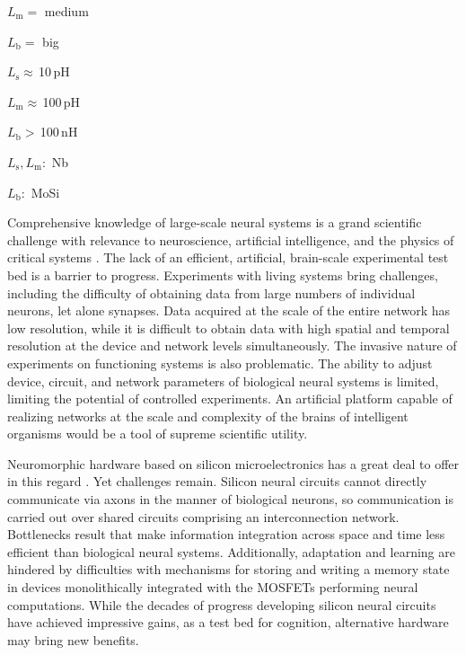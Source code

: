 \documentclass[twocolumn]{article}
\begin{document}
\noindent $L_{\mathrm{m}} =$ medium

\noindent $L_{\mathrm{b}} =$ big

\noindent $L_{\mathrm{s}} \approx$\,10\,pH

\noindent $L_{\mathrm{m}} \approx$\,100\,pH

\noindent $L_{\mathrm{b}} >$\,100\,nH

\noindent $L_{\mathrm{s}}, L_{\mathrm{m}}\!\!:$ Nb

\noindent $L_{\mathrm{b}}\!\!:$ MoSi

Comprehensive knowledge of large-scale neural systems is a grand scientific challenge with relevance to neuroscience, artificial intelligence, and the physics of critical systems \cite{elst2012,ized2008,br2017,fama2019,eide2019}. The lack of an efficient, artificial, brain-scale experimental test bed is a barrier to progress. Experiments with living systems bring challenges, including the difficulty of obtaining data from large numbers of individual neurons, let alone synapses. Data acquired at the scale of the entire network has low resolution, while it is difficult to obtain data with high spatial and temporal resolution at the device and network levels simultaneously. The invasive nature of experiments on functioning systems is also problematic. The ability to adjust device, circuit, and network parameters of biological neural systems is limited, limiting the potential of controlled experiments. An artificial platform capable of realizing networks at the scale and complexity of the brains of intelligent organisms would be a tool of supreme scientific utility.

Neuromorphic hardware based on silicon microelectronics has a great deal to offer in this regard \cite{me1989,lide2015,chba2003,inch2006,voma2007,inli2011,cryu2012,cage2013,pfgr2013,bega2014,fu2016,moqi2018}. Yet challenges remain. Silicon neural circuits cannot directly communicate via axons in the manner of biological neurons, so communication is carried out over shared circuits comprising an interconnection network. Bottlenecks result that make information integration across space and time less efficient than biological neural systems. Additionally, adaptation and learning are hindered by difficulties with mechanisms for storing and writing a memory state in devices monolithically integrated with the MOSFETs performing neural computations. While the decades of progress developing silicon neural circuits have achieved impressive gains, as a test bed for cognition, alternative hardware may bring new benefits.
\end{document}
